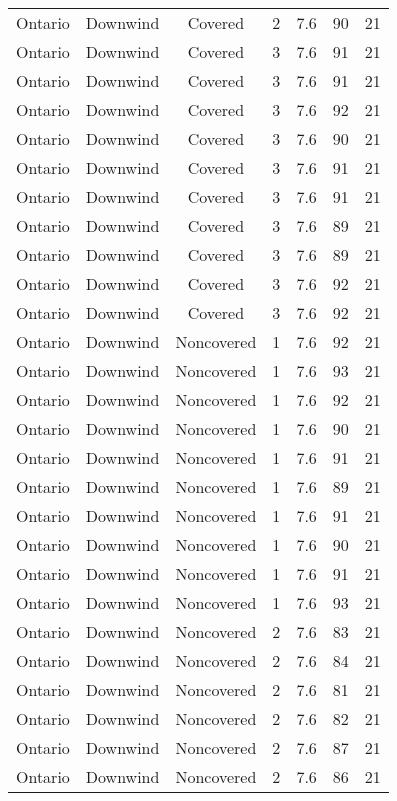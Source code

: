\documentclass{article}
\begin{document}
\begin{longtable}[H]{ccccccc}
Ontario & Downwind & Covered     & 2 & 7.6  & 90  & 21 \\
Ontario & Downwind & Covered     & 3 & 7.6  & 91  & 21 \\
Ontario & Downwind & Covered     & 3 & 7.6  & 91  & 21 \\
Ontario & Downwind & Covered     & 3 & 7.6  & 92  & 21 \\
Ontario & Downwind & Covered     & 3 & 7.6  & 90  & 21 \\
Ontario & Downwind & Covered     & 3 & 7.6  & 91  & 21 \\
Ontario & Downwind & Covered     & 3 & 7.6  & 91  & 21 \\
Ontario & Downwind & Covered     & 3 & 7.6  & 89  & 21 \\
Ontario & Downwind & Covered     & 3 & 7.6  & 89  & 21 \\
Ontario & Downwind & Covered     & 3 & 7.6  & 92  & 21 \\
Ontario & Downwind & Covered     & 3 & 7.6  & 92  & 21 \\
Ontario & Downwind & Noncovered & 1 & 7.6  & 92  & 21 \\
Ontario & Downwind & Noncovered & 1 & 7.6  & 93  & 21 \\
Ontario & Downwind & Noncovered & 1 & 7.6  & 92  & 21 \\
Ontario & Downwind & Noncovered & 1 & 7.6  & 90  & 21 \\
Ontario & Downwind & Noncovered & 1 & 7.6  & 91  & 21 \\
Ontario & Downwind & Noncovered & 1 & 7.6  & 89  & 21 \\
Ontario & Downwind & Noncovered & 1 & 7.6  & 91  & 21 \\
Ontario & Downwind & Noncovered & 1 & 7.6  & 90  & 21 \\
Ontario & Downwind & Noncovered & 1 & 7.6  & 91  & 21 \\
Ontario & Downwind & Noncovered & 1 & 7.6  & 93  & 21 \\
Ontario & Downwind & Noncovered & 2 & 7.6  & 83  & 21 \\
Ontario & Downwind & Noncovered & 2 & 7.6  & 84  & 21 \\
Ontario & Downwind & Noncovered & 2 & 7.6  & 81  & 21 \\
Ontario & Downwind & Noncovered & 2 & 7.6  & 82  & 21 \\
Ontario & Downwind & Noncovered & 2 & 7.6  & 87  & 21 \\
Ontario & Downwind & Noncovered & 2 & 7.6  & 86  & 21 \\

\end{longtable}
\end{document}
